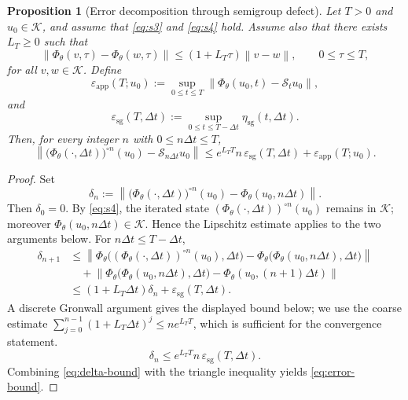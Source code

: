 \documentclass[11pt]{article}
\newtheorem{proposition}{Proposition}
\newcommand{\cS}{\mathcal{S}}
\newcommand{\cK}{\mathcal{K}}
\newcommand{\PhiT}{\Phi_{\theta}}
\newcommand{\norm}[1]{\left\lVert #1 \right\rVert}
\begin{document}
\begin{proposition}[Error decomposition through semigroup defect]\label{prop:error-decomposition}
Let \(T>0\) and \(u_0\in \cK\), and assume that \eqref{eq:s3} and \eqref{eq:s4} hold. Assume also that there exists \(L_T\ge 0\) such that
\begin{equation}\label{eq:lipschitz-step}
\norm{\PhiT(v,\tau)-\PhiT(w,\tau)} \le (1+L_T\tau)\norm{v-w}, \qquad 0\le \tau\le T,
\end{equation}
for all \(v,w\in \cK\). Define
\begin{equation}\label{eq:app-defect}
\varepsilon_{\mathrm{app}}(T;u_0):=\sup_{0\le t\le T}\norm{\PhiT(u_0,t)-\cS_tu_0},
\end{equation}
and
\begin{equation}\label{eq:sg-defect-dt}
\varepsilon_{\mathrm{sg}}(T,\Delta t):=\sup_{0\le t\le T-\Delta t}\eta_{\mathrm{sg}}(t,\Delta t).
\end{equation}
Then, for every integer \(n\) with \(0\le n\Delta t\le T\),
\begin{equation}\label{eq:error-bound}
\norm{\bigl(\PhiT(\cdot,\Delta t)\bigr)^{\circ n}(u_0)-\cS_{n\Delta t}u_0}
\le e^{L_TT}n\,\varepsilon_{\mathrm{sg}}(T,\Delta t)+\varepsilon_{\mathrm{app}}(T;u_0).
\end{equation}
\end{proposition}

\begin{proof}
Set
\begin{equation}\label{eq:delta-def}
\delta_n:=\norm{\bigl(\PhiT(\cdot,\Delta t)\bigr)^{\circ n}(u_0)-\PhiT(u_0,n\Delta t)}.
\end{equation}
Then \(\delta_0=0\). By \eqref{eq:s4}, the iterated state \((\PhiT(\cdot,\Delta t))^{\circ n}(u_0)\) remains in \(\cK\); moreover \(\PhiT(u_0,n\Delta t)\in \cK\). Hence the Lipschitz estimate applies to the two arguments below. For \(n\Delta t\le T-\Delta t\),
\begin{align*}
\delta_{n+1}
&\le \norm{\PhiT\bigl((\PhiT(\cdot,\Delta t))^{\circ n}(u_0),\Delta t\bigr)-\PhiT\bigl(\PhiT(u_0,n\Delta t),\Delta t\bigr)} \\
&\quad + \norm{\PhiT\bigl(\PhiT(u_0,n\Delta t),\Delta t\bigr)-\PhiT(u_0,(n+1)\Delta t)} \\
&\le (1+L_T\Delta t)\delta_n+\varepsilon_{\mathrm{sg}}(T,\Delta t).
\end{align*}
A discrete Gronwall argument gives the displayed bound below; we use the coarse estimate \(\sum_{j=0}^{n-1}(1+L_T\Delta t)^j\le n e^{L_TT}\), which is sufficient for the convergence statement.
\begin{equation}\label{eq:delta-bound}
\delta_n\le e^{L_TT}n\,\varepsilon_{\mathrm{sg}}(T,\Delta t).
\end{equation}
Combining \eqref{eq:delta-bound} with the triangle inequality yields \eqref{eq:error-bound}.
\end{proof}
\end{document}
